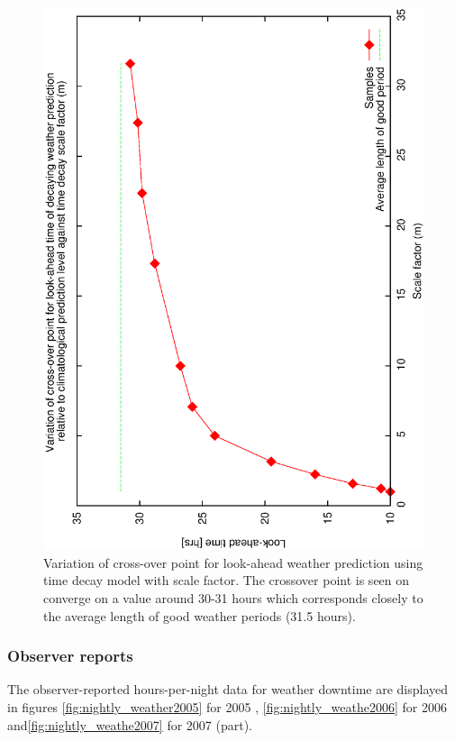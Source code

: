 {{\begin{figure}[htbp]
  \begin{center}
    \includegraphics[scale=0.4, angle=-90]{figures/ecs/m_crossover.eps}
  \end{center}   
  \caption[Variation of cross-over point for look-ahead weather prediction using time decay model with scale factor.]
  {Variation of cross-over point for look-ahead weather prediction using time decay model with scale factor. The crossover point is seen on converge on a value around 30-31 hours which corresponds closely to the average length of good weather periods (31.5 hours).}
  \label{fig:gbc_m_crossover}
\end{figure}




\subsubsection{Observer reports}
The observer-reported hours-per-night data for weather downtime are displayed in figures \ref{fig:nightly_weather2005} for 2005 , \ref{fig:nightly_weathe2006} for 2006  and\ref{fig:nightly_weathe2007} for 2007 (part).

}}
